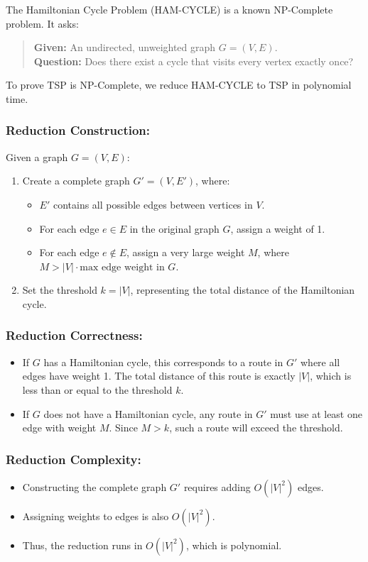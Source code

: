 \documentclass[12pt]{article}
\begin{document}
The Hamiltonian Cycle Problem (HAM-CYCLE) is a known NP-Complete problem. It asks:
\begin{quote}
\textbf{Given:} An undirected, unweighted graph \(G = (V, E)\).\\
\textbf{Question:} Does there exist a cycle that visits every vertex exactly once?
\end{quote}

To prove TSP is NP-Complete, we reduce HAM-CYCLE to TSP in polynomial time.

\subsubsection*{Reduction Construction:}
Given a graph \(G = (V, E)\):
\begin{enumerate}
    \item Create a complete graph \(G' = (V, E')\), where:
    \begin{itemize}
        \item \(E'\) contains all possible edges between vertices in \(V\).
        \item For each edge \(e \in E\) in the original graph \(G\), assign a weight of 1.
        \item For each edge \(e \notin E\), assign a very large weight \(M\), where \(M > |V| \cdot \text{max edge weight in } G\).
    \end{itemize}
    \item Set the threshold \(k = |V|\), representing the total distance of the Hamiltonian cycle.
\end{enumerate}

\subsubsection*{Reduction Correctness:}
\begin{itemize}
    \item If \(G\) has a Hamiltonian cycle, this corresponds to a route in \(G'\) where all edges have weight 1. The total distance of this route is exactly \(|V|\), which is less than or equal to the threshold \(k\).
    \item If \(G\) does not have a Hamiltonian cycle, any route in \(G'\) must use at least one edge with weight \(M\). Since \(M > k\), such a route will exceed the threshold.
\end{itemize}

\subsubsection*{Reduction Complexity:}
\begin{itemize}
    \item Constructing the complete graph \(G'\) requires adding \(O(|V|^2)\) edges.
    \item Assigning weights to edges is also \(O(|V|^2)\).
    \item Thus, the reduction runs in \(O(|V|^2)\), which is polynomial.
\end{itemize}
\end{document}
